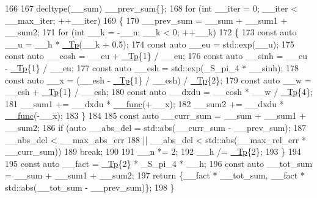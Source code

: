 \begin{DoxyCode}
166 
167       decltype(\_\_sum) \_\_prev\_sum\{\};
168       \textcolor{keywordflow}{for} (\textcolor{keywordtype}{int} \_\_iter = 0; \_\_iter < \_\_max\_iter; ++\_\_iter)
169         \{
170           \_\_prev\_sum = \_\_sum + \_\_sum1 + \_\_sum2;
171           \textcolor{keywordflow}{for} (\textcolor{keywordtype}{int} \_\_k  = -\_\_n; \_\_k < 0; ++\_\_k)
172             \{
173               \textcolor{keyword}{const} \textcolor{keyword}{auto} \_\_u = \_\_h * \hyperlink{namespace____gnu__cxx_a3b19a9c800ca194374ef9172290f7d79}{\_Tp}(\_\_k + 0.5);
174               \textcolor{keyword}{const} \textcolor{keyword}{auto} \_\_eu = std::exp(\_\_u);
175               \textcolor{keyword}{const} \textcolor{keyword}{auto} \_\_cosh = \_\_eu + \hyperlink{namespace____gnu__cxx_a3b19a9c800ca194374ef9172290f7d79}{\_Tp}\{1\} / \_\_eu;
176               \textcolor{keyword}{const} \textcolor{keyword}{auto} \_\_sinh = \_\_eu - \hyperlink{namespace____gnu__cxx_a3b19a9c800ca194374ef9172290f7d79}{\_Tp}\{1\} / \_\_eu;
177               \textcolor{keyword}{const} \textcolor{keyword}{auto} \_\_esh = std::exp(\_S\_pi\_4 * \_\_sinh);
178               \textcolor{keyword}{const} \textcolor{keyword}{auto} \_\_x = (\_\_esh - \hyperlink{namespace____gnu__cxx_a3b19a9c800ca194374ef9172290f7d79}{\_Tp}\{1\} / \_\_esh) / \hyperlink{namespace____gnu__cxx_a3b19a9c800ca194374ef9172290f7d79}{\_Tp}\{2\};
179               \textcolor{keyword}{const} \textcolor{keyword}{auto} \_\_w = \_\_esh + \hyperlink{namespace____gnu__cxx_a3b19a9c800ca194374ef9172290f7d79}{\_Tp}\{1\} / \_\_esh;
180               \textcolor{keyword}{const} \textcolor{keyword}{auto} \_\_dxdu = \_\_cosh * \_\_w / \hyperlink{namespace____gnu__cxx_a3b19a9c800ca194374ef9172290f7d79}{\_Tp}\{4\};
181               \_\_sum1 += \_\_dxdu * \hyperlink{namespace____gnu__cxx_af2b2f0c7a2ae72b922b1afefae5a65b2}{\_\_func}(+\_\_x);
182               \_\_sum2 += \_\_dxdu * \hyperlink{namespace____gnu__cxx_af2b2f0c7a2ae72b922b1afefae5a65b2}{\_\_func}(-\_\_x);
183             \}
184 
185           \textcolor{keyword}{const} \textcolor{keyword}{auto} \_\_curr\_sum = \_\_sum + \_\_sum1 + \_\_sum2;
186           \textcolor{keywordflow}{if} (\textcolor{keyword}{auto} \_\_abs\_del = std::abs(\_\_curr\_sum - \_\_prev\_sum);
187               \_\_abs\_del < \_\_max\_abs\_err
188               || \_\_abs\_del < std::abs(\_\_max\_rel\_err * \_\_curr\_sum))
189             \textcolor{keywordflow}{break};
190 
191           \_\_n *= 2;
192           \_\_h /= \hyperlink{namespace____gnu__cxx_a3b19a9c800ca194374ef9172290f7d79}{\_Tp}\{2\};
193         \}
194 
195       \textcolor{keyword}{const} \textcolor{keyword}{auto} \_\_fact = \hyperlink{namespace____gnu__cxx_a3b19a9c800ca194374ef9172290f7d79}{\_Tp}\{2\} * \_S\_pi\_4 * \_\_h;
196       \textcolor{keyword}{const} \textcolor{keyword}{auto} \_\_tot\_sum = \_\_sum + \_\_sum1 + \_\_sum2;
197       \textcolor{keywordflow}{return} \{\_\_fact * \_\_tot\_sum, \_\_fact * std::abs(\_\_tot\_sum - \_\_prev\_sum)\};
198     \}
\end{DoxyCode}
